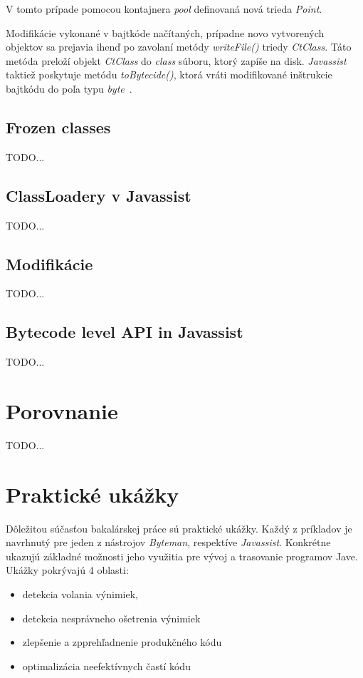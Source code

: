 \documentclass[11pt,final,oneside]{fithesis}
\begin{document}
V tomto prípade pomocou kontajnera \textit{pool} definovaná nová trieda
\textit{Point}. 

Modifikácie vykonané v bajtkóde načítaných, prípadne novo vytvorených objektov sa prejavia ihenď po zavolaní metódy \textit{writeFile()} triedy
\textit{CtClass}. Táto metóda preloží objekt \textit{CtClass} do \textit{class} súboru, ktorý zapíše na disk. \textit{Javassist} taktiež poskytuje metódu \textit{toBytecide()}, ktorá vráti modifikované inštrukcie bajtkódu do poľa typu \textit{byte}~\cite{Chiba:Javassist}.
 
\section{Frozen classes}
TODO...

\section{ClassLoadery v Javassist}
TODO...

\section{Modifikácie}
TODO...

\section{Bytecode level API in Javassist}
TODO...

\chapter{Porovnanie}
TODO...

\chapter{Praktické ukážky}
Dôležitou súčasťou bakalárskej práce sú praktické ukážky. Každý z príkladov je navrhnutý pre jeden z nástrojov \textit{Byteman}, respektíve \textit{Javassist}. Konkrétne ukazujú základné možnosti jeho využitia pre vývoj a trasovanie programov Jave. Ukážky pokrývajú 4 oblasti:

\begin{itemize}
\item detekcia volania výnimiek, 
\item detekcia nesprávneho ošetrenia výnimiek
\item zlepšenie a zpprehľadnenie produkčného kódu
\item optimalizácia neefektívnych častí kódu
\end{itemize}
\end{document}
